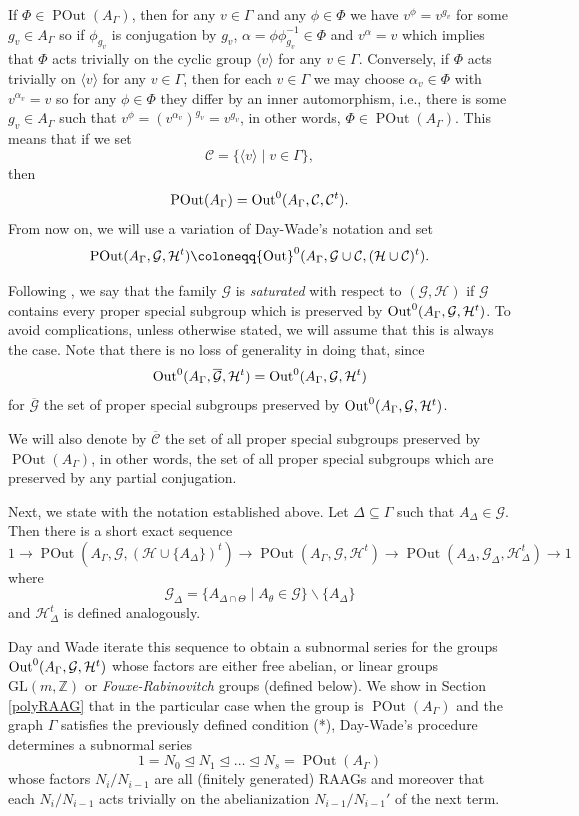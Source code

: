 \documentclass[10pt]{amsart}
\theoremstyle{definition}
\newcommand{\Out}{{\rm Out}}
\newcommand{\Z}{\mathbb Z}
\newcommand{\POut}{\operatorname {POut}}
\theoremstyle{definition}
\numberwithin{equation}{section}
\begin{document}
 If $\Phi\in\POut(A_\Gamma)$, then for any $v\in\Gamma$ and any $\phi\in\Phi$ we have $v^\phi=v^{g_v}$ for some $g_v\in A_\Gamma$ so if $\phi_{g_v}$ is conjugation by $g_v$, $\alpha=\phi\phi_{g_v}^{-1}\in\Phi$ and $v^\alpha=v$ which implies that $\Phi$ acts trivially on the cyclic group $\langle v\rangle$ for any $v\in\Gamma$. Conversely, if $\Phi$ acts trivially on $\langle v\rangle$ for any $v\in\Gamma$, then for each $v\in\Gamma$ we may choose $\alpha_v\in\Phi$ with $v^{\alpha_v}=v$ so for any $\phi\in\Phi$ they differ by an inner automorphism, i.e., there is some $g_v\in A_\Gamma$ such that $v^\phi=(v^{\alpha_v})^{g_v}=v^{g_v}$, in other words, $\Phi\in\POut(A_\Gamma)$. This means that if we set
 \[\mathcal{C}=\{\langle v\rangle\mid v\in\Gamma\},\]
 then 
 \[\POut(A_\Gamma)=\Out^0(A_\Gamma,\mathcal{C},\mathcal{C}^t).\]
 From now on, we will use a variation of Day-Wade's notation and set
 \[\POut(A_\Gamma,\mathcal{G},\mathcal{H}^t)\coloneqq \Out^0(A_\Gamma,\mathcal{G}\cup\mathcal{C},(\mathcal{H}\cup\mathcal{C})^t).\]


 Following \cite{DayWade}, we say that the family $\mathcal{G}$ is {\sl saturated} with respect to $(\mathcal{G},\mathcal{H})$ if $\mathcal{G}$ contains every proper special subgroup which is  preserved by $\Out^0(A_\Gamma,\mathcal{G},\mathcal{H}^t)$. To avoid complications, unless otherwise stated, we will assume that this is always the case. Note that there is no loss of generality in doing that, since
 \[\Out^0(A_\Gamma,\overline{\mathcal{G}},\mathcal{H}^t)=\Out^0(A_\Gamma,\mathcal{G},\mathcal{H}^t)\]
 for $\overline{\mathcal{G}}$ the set of proper special subgroups preserved by $\Out^0(A_\Gamma,\mathcal{G},\mathcal{H}^t)$.
 
 We will also denote by $\overline{\mathcal{C}}$ the set of all proper special subgroups preserved by $\POut(A_\Gamma)$, in other words, the set of all proper special subgroups which are preserved by any partial conjugation.
  
Next, we state  \cite[Theorem E]{DayWade} with the notation established above. Let $\Delta \subseteq\Gamma$ such that $A_\Delta\in\mathcal{G}$. Then there is a short exact sequence
 \[1\to\POut(A_\Gamma,\mathcal{G},(\mathcal{H}\cup\{A_\Delta\})^t)\to\POut(A_\Gamma,\mathcal{G},\mathcal{H}^t)\to\POut(A_\Delta,\mathcal{G}_\Delta,\mathcal{H}_\Delta^t)\to 1\]
 where 
 \[\mathcal{G}_\Delta=\{A_{\Delta\cap\Theta}\mid A_\theta\in\mathcal{G}\}\smallsetminus\{A_\Delta\}\]
  and $\mathcal{H}_\Delta^t$ is defined analogously.
  
  Day and Wade iterate this sequence to obtain a subnormal series for the groups $\Out^0(A_\Gamma,\mathcal{G},\mathcal{H}^t)$ whose factors are either free abelian, or linear groups $\mathrm{GL}(m,\Z)$ or {\sl Fouxe-Rabinovitch} groups (defined below). We show in Section \ref{polyRAAG} that in the particular case when the group is $\POut(A_\Gamma)$ and the graph $\Gamma$ satisfies the previously defined condition (*), Day-Wade's procedure determines a subnormal series
  \[1=N_0\trianglelefteq N_1\trianglelefteq\ldots\trianglelefteq N_s=\POut(A_\Gamma)\]
  whose factors $N_i/N_{i-1}$ are all (finitely generated) RAAGs and moreover that each  $N_i/N_{i-1}$ acts trivially on the abelianization $N_{i-1}/N_{i-1}'$ of the next term.
  
\end{document}
